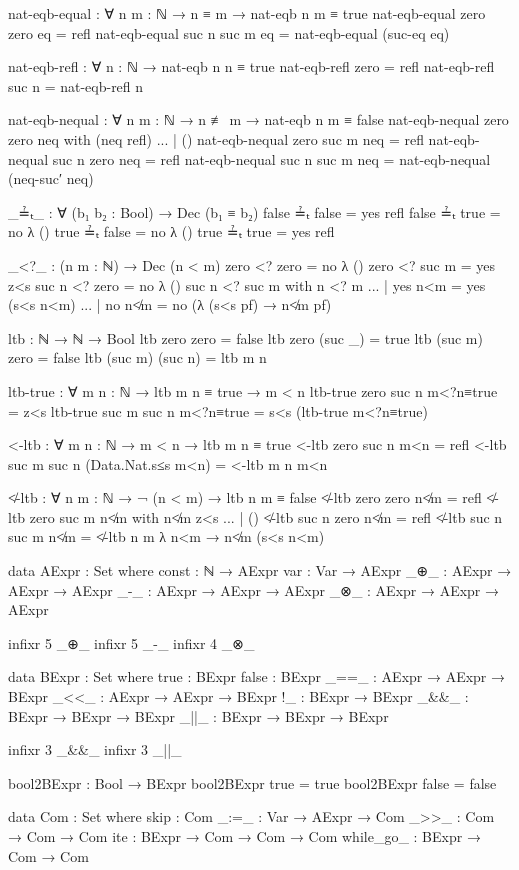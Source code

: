\documentclass{lecturenotes}
\begin{document}
\begin{code}[hide]
nat-eqb-equal : ∀ {n m : ℕ} → n ≡ m → nat-eqb n m ≡ true
nat-eqb-equal {zero} {zero} eq = refl
nat-eqb-equal {suc n} {suc m} eq = nat-eqb-equal (suc-eq eq)

nat-eqb-refl : ∀ {n : ℕ} → nat-eqb n n ≡ true
nat-eqb-refl {zero} = refl
nat-eqb-refl {suc n} = nat-eqb-refl {n}

nat-eqb-nequal : ∀ {n m : ℕ} → n ≢ m → nat-eqb n m ≡ false
nat-eqb-nequal {zero} {zero} neq with (neq refl)
... | () 
nat-eqb-nequal {zero} {suc m} neq = refl
nat-eqb-nequal {suc n} {zero} neq = refl
nat-eqb-nequal {suc n} {suc m} neq = nat-eqb-nequal (neq-suc′ neq)

_≟ₜ_ : ∀ (b₁ b₂ : Bool) → Dec (b₁ ≡ b₂)
false ≟ₜ false = yes refl
false ≟ₜ true = no λ ()
true ≟ₜ false = no λ ()
true ≟ₜ true = yes refl

_<?_ : (n m : ℕ) → Dec (n < m)
zero <? zero = no λ ()
zero <? suc m = yes z<s
suc n <? zero = no λ ()
suc n <? suc m with n <? m
... | yes n<m = yes (s<s n<m)
... | no n≮m = no (λ {(s<s pf) → n≮m pf}) 

ltb : ℕ → ℕ → Bool
ltb zero zero = false
ltb zero (suc _) = true
ltb (suc m) zero = false
ltb (suc m) (suc n) = ltb m n

ltb-true : ∀ {m n : ℕ} → ltb m n ≡ true → m < n
ltb-true {zero} {suc n} m<?n≡true = z<s
ltb-true {suc m} {suc n} m<?n≡true = s<s (ltb-true m<?n≡true)

<-ltb : ∀ {m n : ℕ} → m < n → ltb m n ≡ true
<-ltb {zero} {suc n} m<n = refl
<-ltb {suc m} {suc n} (Data.Nat.s≤s m<n) = <-ltb {m} {n} m<n

≮-ltb : ∀ {n m : ℕ} → ¬ (n < m) → ltb n m ≡ false
≮-ltb {zero} {zero} n≮m = refl
≮-ltb {zero} {suc m} n≮m with n≮m z<s
... | ()
≮-ltb {suc n} {zero} n≮m = refl
≮-ltb {suc n} {suc m} n≮m = ≮-ltb {n} {m} λ n<m → n≮m (s<s n<m)

data AExpr : Set where
  const : ℕ → AExpr
  var : Var → AExpr
  _⊕_ : AExpr → AExpr → AExpr
  _-_ : AExpr → AExpr → AExpr
  _⊗_ : AExpr → AExpr → AExpr

infixr 5 _⊕_
infixr 5 _-_
infixr 4 _⊗_

data BExpr : Set where
  true : BExpr
  false : BExpr
  _==_ : AExpr → AExpr → BExpr
  _<<_ : AExpr → AExpr → BExpr
  !_ : BExpr → BExpr
  _&&_ : BExpr → BExpr → BExpr
  _||_ : BExpr → BExpr → BExpr

infixr 3 _&&_
infixr 3 _||_

bool2BExpr : Bool → BExpr
bool2BExpr true = true
bool2BExpr false = false

data Com : Set where
  skip : Com
  _:=_ : Var → AExpr → Com
  _>>_ : Com → Com → Com
  ite : BExpr → Com → Com → Com
  while_go_ : BExpr → Com → Com



\end{code}
\end{document}
